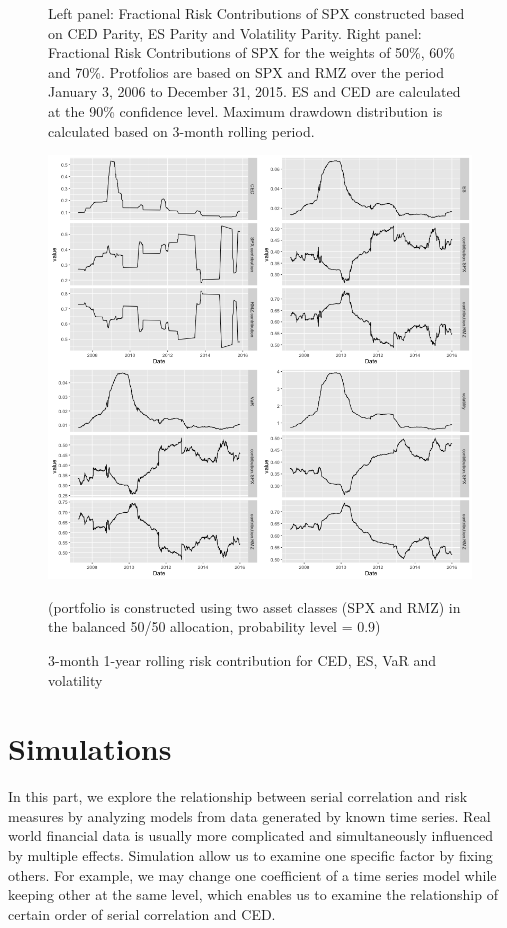 \documentclass[11pt]{article}
\begin{document}
\begin{figure}[H]
\begin{minipage}[b]{0.48\textwidth}
  \end{minipage}
  \caption{Left panel: Fractional Risk Contributions of SPX constructed based on CED Parity, ES Parity and Volatility Parity. Right panel: Fractional Risk Contributions of SPX for the weights of 50\%, 60\% and 70\%. Protfolios are based on SPX and RMZ over the period January 3, 2006 to December 31, 2015. ES and CED are calculated at the 90\% confidence level. Maximum drawdown distribution is calculated based on 3-month rolling period.}
  \label{fig:risk_parity_and_risk_rd}
\end{figure}

\begin{figure}
\centering
\includegraphics[width = 1\textwidth]{../figures/risk_contribution/SPX_RMZ_55}
\caption{3-month 1-year rolling risk contribution for CED, ES, VaR and volatility}
(portfolio is constructed using two asset classes (SPX and RMZ) in the balanced 50/50 allocation, probability level = 0.9)
\label{fig:risk_contribution_SPX_RMZ_55}
\end{figure}


\part{Simulations}

In this part, we explore the relationship between serial correlation and risk measures by analyzing models from data generated by known time series. Real world financial data is usually more complicated and simultaneously influenced by multiple effects. Simulation allow us to examine one specific factor by fixing others. For example, we may change one coefficient of a time series model while keeping other at the same level, which enables us to examine the relationship of certain order of serial correlation and CED.
\end{document}
